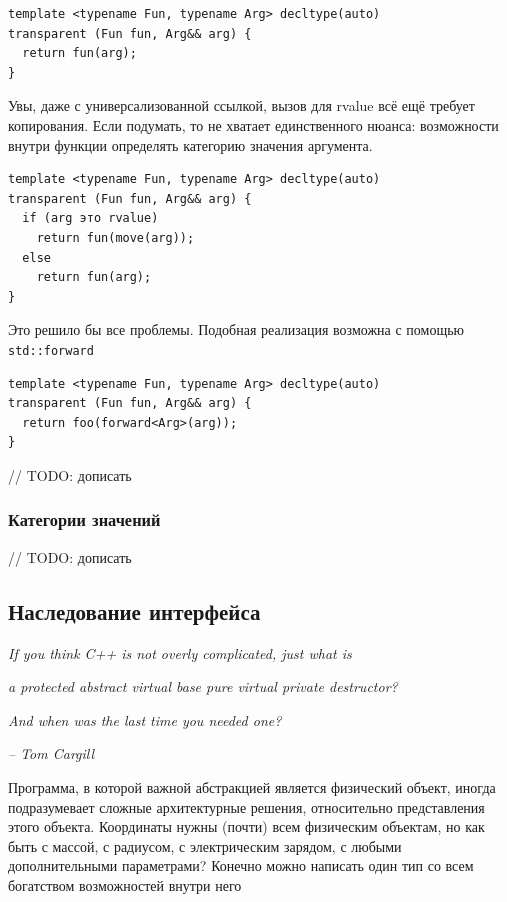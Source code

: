 \documentclass[a4paper,12pt,oneside]{article}
\begin{document}
\begin{lstlisting}
template <typename Fun, typename Arg> decltype(auto)
transparent (Fun fun, Arg&& arg) {
  return fun(arg);
}
\end{lstlisting}

Увы, даже с универсализованной ссылкой, вызов для rvalue всё ещё требует копирования. Если подумать, то не хватает единственного нюанса: возможности внутри функции определять категорию значения аргумента.

\begin{lstlisting}
template <typename Fun, typename Arg> decltype(auto)
transparent (Fun fun, Arg&& arg) {
  if (arg это rvalue)
    return fun(move(arg));
  else
    return fun(arg);
}
\end{lstlisting}

Это решило бы все проблемы. Подобная реализация возможна с помощью \lstinline!std::forward!

\begin{lstlisting}
template <typename Fun, typename Arg> decltype(auto)
transparent (Fun fun, Arg&& arg) {
  return foo(forward<Arg>(arg));
}
\end{lstlisting}

// TODO: дописать

\subsubsection{Категории значений}

// TODO: дописать

\pagebreak
\subsection{Наследование интерфейса}\label{IntfInheritance}

\hfill\textit{If you think C++ is not overly complicated, just what is} 

\hfill\textit{a protected abstract virtual base pure virtual private destructor?}

\hfill\textit{And when was the last time you needed one?}{\vspace{0.5em}}

\hfill\textit{-- Tom Cargill}

Программа, в которой важной абстракцией является физический объект, иногда подразумевает сложные архитектурные решения, относительно представления этого объекта. Координаты нужны (почти) всем физическим объектам, но как быть с массой, с радиусом, с электрическим зарядом, с любыми дополнительными параметрами? Конечно можно написать один тип со всем богатством возможностей внутри него
\end{document}

